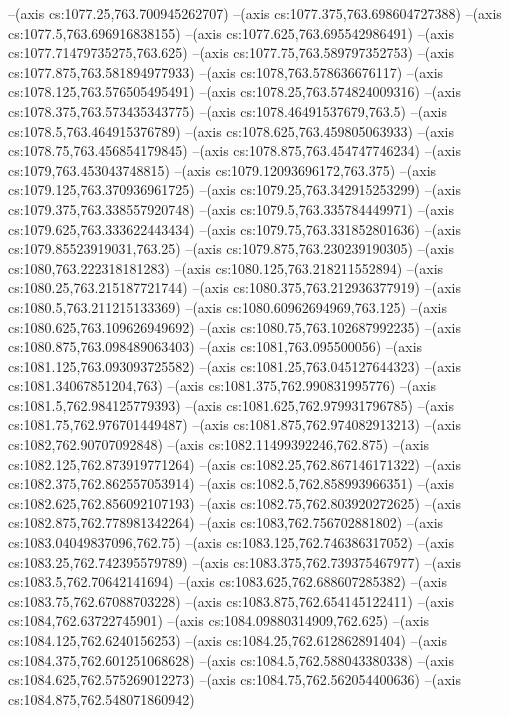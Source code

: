 --(axis cs:1077.25,763.700945262707)
--(axis cs:1077.375,763.698604727388)
--(axis cs:1077.5,763.696916838155)
--(axis cs:1077.625,763.695542986491)
--(axis cs:1077.71479735275,763.625)
--(axis cs:1077.75,763.589797352753)
--(axis cs:1077.875,763.581894977933)
--(axis cs:1078,763.578636676117)
--(axis cs:1078.125,763.576505495491)
--(axis cs:1078.25,763.574824009316)
--(axis cs:1078.375,763.573435343775)
--(axis cs:1078.46491537679,763.5)
--(axis cs:1078.5,763.464915376789)
--(axis cs:1078.625,763.459805063933)
--(axis cs:1078.75,763.456854179845)
--(axis cs:1078.875,763.454747746234)
--(axis cs:1079,763.453043748815)
--(axis cs:1079.12093696172,763.375)
--(axis cs:1079.125,763.370936961725)
--(axis cs:1079.25,763.342915253299)
--(axis cs:1079.375,763.338557920748)
--(axis cs:1079.5,763.335784449971)
--(axis cs:1079.625,763.333622443434)
--(axis cs:1079.75,763.331852801636)
--(axis cs:1079.85523919031,763.25)
--(axis cs:1079.875,763.230239190305)
--(axis cs:1080,763.222318181283)
--(axis cs:1080.125,763.218211552894)
--(axis cs:1080.25,763.215187721744)
--(axis cs:1080.375,763.212936377919)
--(axis cs:1080.5,763.211215133369)
--(axis cs:1080.60962694969,763.125)
--(axis cs:1080.625,763.109626949692)
--(axis cs:1080.75,763.102687992235)
--(axis cs:1080.875,763.098489063403)
--(axis cs:1081,763.095500056)
--(axis cs:1081.125,763.093093725582)
--(axis cs:1081.25,763.045127644323)
--(axis cs:1081.34067851204,763)
--(axis cs:1081.375,762.990831995776)
--(axis cs:1081.5,762.984125779393)
--(axis cs:1081.625,762.979931796785)
--(axis cs:1081.75,762.976701449487)
--(axis cs:1081.875,762.974082913213)
--(axis cs:1082,762.90707092848)
--(axis cs:1082.11499392246,762.875)
--(axis cs:1082.125,762.873919771264)
--(axis cs:1082.25,762.867146171322)
--(axis cs:1082.375,762.862557053914)
--(axis cs:1082.5,762.858993966351)
--(axis cs:1082.625,762.856092107193)
--(axis cs:1082.75,762.803920272625)
--(axis cs:1082.875,762.778981342264)
--(axis cs:1083,762.756702881802)
--(axis cs:1083.04049837096,762.75)
--(axis cs:1083.125,762.746386317052)
--(axis cs:1083.25,762.742395579789)
--(axis cs:1083.375,762.739375467977)
--(axis cs:1083.5,762.70642141694)
--(axis cs:1083.625,762.688607285382)
--(axis cs:1083.75,762.67088703228)
--(axis cs:1083.875,762.654145122411)
--(axis cs:1084,762.63722745901)
--(axis cs:1084.09880314909,762.625)
--(axis cs:1084.125,762.6240156253)
--(axis cs:1084.25,762.612862891404)
--(axis cs:1084.375,762.601251068628)
--(axis cs:1084.5,762.588043380338)
--(axis cs:1084.625,762.575269012273)
--(axis cs:1084.75,762.562054400636)
--(axis cs:1084.875,762.548071860942)
